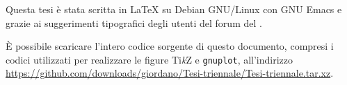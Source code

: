 \thispagestyle{empty}
\hfill
\vfill
Questa tesi è stata scritta in \LaTeX{} su Debian GNU/Linux con GNU Emacs e
grazie ai suggerimenti tipografici degli utenti del forum del \GuIT.

È possibile scaricare l'intero codice sorgente di questo documento, compresi i
codici utilizzati per realizzare le figure Ti\emph{k}Z e \texttt{gnuplot},
all'indirizzo
\url{https://github.com/downloads/giordano/Tesi-triennale/Tesi-triennale.tar.xz}.

